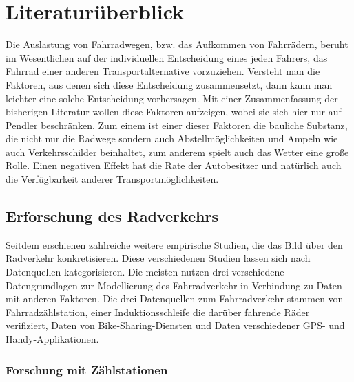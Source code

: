 \documentclass[a4paper,12pt]{thesis}
\begin{document}
\chapter{Literaturüberblick}

Die Auslastung von Fahrradwegen, bzw. das Aufkommen von Fahrrädern, beruht im Wesentlichen auf der individuellen Entscheidung eines jeden Fahrers, das Fahrrad einer anderen Transportalternative vorzuziehen. Versteht man die Faktoren, aus denen sich diese Entscheidung zusammensetzt, dann kann man leichter eine solche Entscheidung vorhersagen. Mit einer Zusammenfassung der bisherigen Literatur wollen \cite{Heinen2010} diese Faktoren aufzeigen, wobei sie sich hier nur auf Pendler beschränken. Zum einem ist einer dieser Faktoren die bauliche Substanz, die nicht nur die Radwege sondern auch Abstellmöglichkeiten und Ampeln wie auch Verkehrsschilder beinhaltet, zum anderem spielt auch das Wetter eine große Rolle. Einen negativen Effekt hat die Rate der Autobesitzer und natürlich auch die Verfügbarkeit anderer Transportmöglichkeiten.\\

\section{Erforschung des Radverkehrs}

Seitdem erschienen zahlreiche weitere empirische Studien, die das Bild über den Radverkehr konkretisieren. Diese verschiedenen Studien lassen sich nach Datenquellen kategorisieren. Die meisten nutzen drei verschiedene Datengrundlagen zur Modellierung des Fahrradverkehr in Verbindung zu Daten mit anderen Faktoren. Die drei Datenquellen zum Fahrradverkehr stammen von Fahrradzählstation, einer Induktionsschleife die darüber fahrende Räder verifiziert, Daten von Bike-Sharing-Diensten und Daten verschiedener GPS- und Handy-Applikationen.\\

\subsection{Forschung mit Zählstationen}
\end{document}
